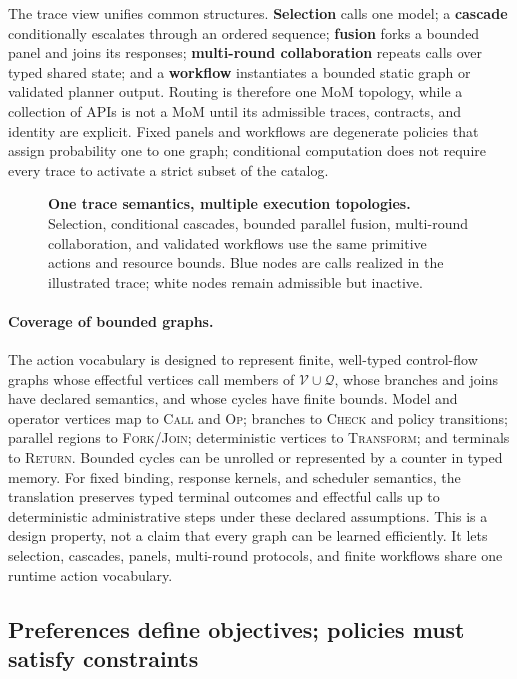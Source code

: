 The trace view unifies common structures.  \textbf{Selection} calls one model;
a \textbf{cascade} conditionally escalates through an ordered sequence;
\textbf{fusion} forks a bounded panel and joins its responses;
\textbf{multi-round collaboration} repeats calls over typed shared state; and a
\textbf{workflow} instantiates a bounded static graph or validated planner
output.  Routing is therefore one MoM topology, while a collection of APIs is
not a MoM until its admissible traces, contracts, and identity are explicit.
Fixed panels and workflows are degenerate policies that assign probability one
to one graph; conditional computation does not require every trace to activate
a strict subset of the catalog.

\begin{figure}[H]
  \centering
  \resizebox{\linewidth}{!}{}
  \caption{\textbf{One trace semantics, multiple execution topologies.}
  Selection, conditional cascades, bounded parallel fusion, multi-round
  collaboration, and validated workflows use the same primitive actions and
  resource bounds.  Blue nodes are calls realized in the illustrated trace;
  white nodes remain admissible but inactive.}
  \label{fig:trace-topologies}
\end{figure}

\paragraph{Coverage of bounded graphs.}
The action vocabulary is designed to represent finite, well-typed control-flow graphs
whose effectful vertices call members of $\mathcal{V}\cup\mathcal{Q}$, whose
branches and joins have declared semantics, and whose cycles have finite bounds.
Model and operator vertices map to \textsc{Call} and \textsc{Op}; branches to
\textsc{Check} and policy transitions; parallel regions to
\textsc{Fork}/\textsc{Join}; deterministic vertices to \textsc{Transform}; and
terminals to \textsc{Return}. Bounded cycles can be unrolled or represented by
a counter in typed memory. For fixed binding, response kernels, and scheduler
semantics, the translation preserves typed terminal outcomes and effectful
calls up to deterministic administrative steps under these declared
assumptions. This is a design property, not a claim that every graph can be
learned efficiently. It lets
selection, cascades, panels, multi-round protocols, and finite workflows share
one runtime action vocabulary.

\subsection{Preferences define objectives; policies must satisfy constraints}
\label{sec:objectives}

